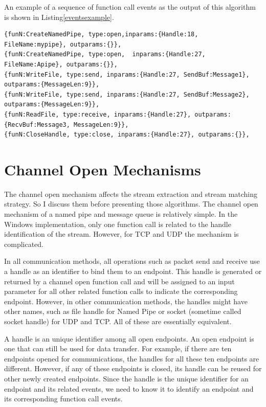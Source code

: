 An example of a sequence of function call events as the output of this algorithm is shown in Listing\ref{eventsexample}.

\begin{lstlisting}[caption= Example of  $etr$, label=eventsexample]
{funN:CreateNamedPipe, type:open,inparams:{Handle:18, FileName:mypipe}, outparams:{}},
{funN:CreateNamedPipe, type:open,  inparams:{Handle:27,  FileName:Apipe}, outparams:{}},
{funN:WriteFile, type:send, inparams:{Handle:27, SendBuf:Message1}, outparams:{MessageLen:9}},
{funN:WriteFile, type:send, inparams:{Handle:27, SendBuf:Message2}, outparams:{MessageLen:9}},
{funN:ReadFile, type:receive, inparams:{Handle:27}, outparams:{RecvBuf:Message3, MessageLen:9}},
{funN:CloseHandle, type:close, inparams:{Handle:27}, outparams:{}},
\end{lstlisting}

\section{Channel Open Mechanisms}\label{mecha}
The channel open mechanism affects the stream extraction and stream matching strategy. So I discuss them before presenting those algorithms. The channel open mechanism of a named pipe and message queue is relatively simple. In the Windows implementation, only one function call is related to the handle identification of the stream. However, for TCP and UDP the mechanism is complicated.

In all communication methods, all operations such as packet send and receive use a handle as an identifier to bind them to an endpoint. This handle is generated or returned by a channel open function call and will be assigned to an input parameter for all other related function calls to indicate the corresponding endpoint. However, in other communication methods, the handles might have other names, such as file handle for Named Pipe or socket (sometime called socket handle) for UDP and TCP. All of these are essentially equivalent.

A handle is an unique identifier among all open endpoints. An open endpoint is one that can still be used for data transfer. For example, if there are ten endpoints opened for communications, the handles for all these ten endpoints are different. However, if any of these endpoints is closed, its handle can be reused for other newly created endpoints. Since the handle is the unique identifier for an endpoint and its related events, we need to know it to identify an endpoint and its corresponding function call events. 

